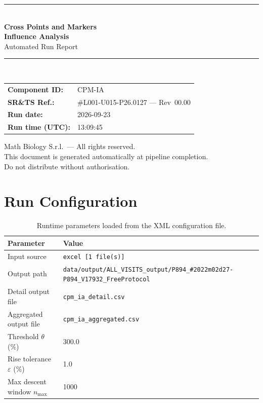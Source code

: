 \documentclass[a4paper,11pt]{article}
\begin{document}
\begin{titlepage}
\begin{center}
  \vspace*{1.8cm}
  {\color{dmaaccent}\rule{\linewidth}{1.5pt}}\\[0.6cm]
  {\LARGE\bfseries\color{dmaaccent}
    Cross Points and Markers\\[0.25cm]
    Influence Analysis}\\[0.4cm]
  {\Large Automated Run Report}\\[0.3cm]
  {\color{dmaaccent}\rule{\linewidth}{1.5pt}}\\[2cm]

  \begin{tabular}{ll}
    \textbf{Component ID:}   & CPM-IA \\[0.3cm]
    \textbf{SR\&TS Ref.:}    & \#L001-U015-P26.0127 --- Rev~00.00 \\[0.3cm]
    \textbf{Run date:}       & 2026-09-23 \\[0.3cm]
    \textbf{Run time (UTC):} & 13:09:45 \\
  \end{tabular}

  \vfill
  {\color{dmagray}\small
    Math Biology S.r.l.\ --- All rights reserved.\\
    This document is generated automatically at pipeline completion.\\
    Do not distribute without authorisation.}
\end{center}
\end{titlepage}

\tableofcontents
\clearpage

\section{Run Configuration}

\begin{table}[h!]
\centering
\small
\caption{Runtime parameters loaded from the XML configuration file.}
\begin{tabular}{ll}
\toprule
\textbf{Parameter} & \textbf{Value} \\
\midrule
Input source                      & \texttt{excel [1 file(s)]} \\
Output path                       & \texttt{data/output/ALL\_VISITS\_output/P894\_\#2022m02d27-P894\_V17932\_FreeProtocol} \\
Detail output file                & \texttt{cpm\_ia\_detail.csv} \\
Aggregated output file            & \texttt{cpm\_ia\_aggregated.csv} \\
Threshold $\theta$ (\%)           & 300.0 \\
Rise tolerance $\varepsilon$ (\%) & 1.0 \\
Max descent window $n_{\max}$     & 1000 \\
\bottomrule
\end{tabular}
\end{table}
\end{document}
